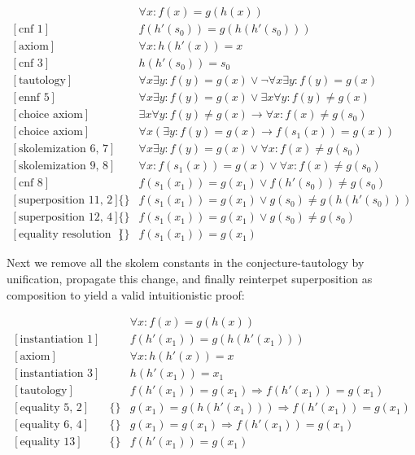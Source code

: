 \documentclass[onehalfspacing]{article}
\theoremstyle{definition}
\theoremstyle{definition}
\theoremstyle{definition}
\theoremstyle{definition}
\theoremstyle{definition}
\theoremstyle{definition}
\begin{document}
\setcounter{equation}{0}
\begin{align}
	[\text{axiom}]&&\forall x: f(x) = g(h(x))\\
	[\text{cnf 1}]&&f(h'(s_0)) = g(h(h'(s_0)))\\
	[\text{axiom}]&&\forall x: h(h'(x)) = x\\
	[\text{cnf 3}]&&h(h'(s_0)) = s_0\\
	[\text{tautology}]&&\forall x\exists y: f(y) = g(x)\vee\neg\forall x\exists y: f(y) = g(x)\\
	[\text{ennf 5}]&&\forall x\exists y: f(y) = g(x)\vee\exists x\forall y: f(y)\neq g(x)\\
	[\text{choice axiom}]&&\exists x\forall y: f(y)\neq g(x)\rightarrow \forall x : f(x) \neq g(s_0)\\
	[\text{choice axiom}]&&\forall x(\exists y: f(y)= g(x)\rightarrow f(s_1(x)) = g(x))\\
	[\text{skolemization 6, 7}]&&\forall x\exists y: f(y) = g(x)\vee\forall x: f(x)\neq g(s_0)\\
	[\text{skolemization 9, 8}]&&\forall x: f(s_1(x)) = g(x)\vee\forall x: f(x)\neq g(s_0)\\
	[\text{cnf 8}]&&f(s_1(x_1)) = g(x_1)\vee f(h'(s_0))\neq g(s_0)\\
	[\text{superposition 11, 2}]&\{\}&f(s_1(x_1)) = g(x_1)\vee g(s_0)\neq g(h(h'(s_0)))\\
	[\text{superposition 12, 4}]&\{\}&f(s_1(x_1)) = g(x_1)\vee g(s_0)\neq g(s_0)\\
	[\text{equality resolution 13}]&\{\}&f(s_1(x_1)) = g(x_1)
\end{align}

Next we remove all the skolem constants in the conjecture-tautology by unification, propagate this change, and finally reinterpet superposition as composition to yield a valid intuitionistic proof:

\setcounter{equation}{0}
\begin{align}
	[\text{axiom}]&&\forall x: f(x) = g(h(x))\\
	[\text{instantiation 1}]&&f(h'(x_1)) = g(h(h'(x_1)))\\
	[\text{axiom}]&&\forall x: h(h'(x)) = x\\
	[\text{instantiation 3}]&&h(h'(x_1)) = x_1\\
	[\text{tautology}]&&f(h'(x_1)) = g(x_1)\Rightarrow f(h'(x_1)) = g(x_1)\\
	[\text{equality 5, 2}]&\{\}&g(x_1)= g(h(h'(x_1)))\Rightarrow f(h'(x_1)) = g(x_1)\\
	[\text{equality 6, 4}]&\{\}&g(x_1)= g(x_1)\Rightarrow f(h'(x_1)) = g(x_1)\\
	[\text{equality 13}]&\{\}&f(h'(x_1)) = g(x_1)
\end{align}
\end{document}
